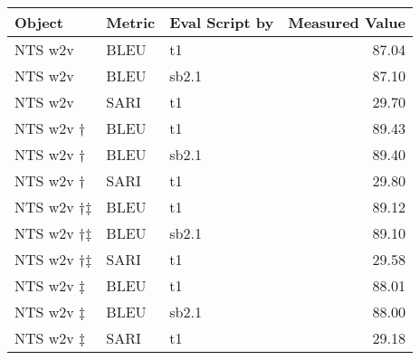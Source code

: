 \begin{tabular}{lllr}
\toprule
     Object & Metric & Eval Script by & Measured Value \\
\midrule
    NTS w2v &   BLEU &             t1 &          87.04 \\
    NTS w2v &   BLEU &          sb2.1 &          87.10 \\
    NTS w2v &   SARI &             t1 &          29.70 \\
  NTS w2v † &   BLEU &             t1 &          89.43 \\
  NTS w2v † &   BLEU &          sb2.1 &          89.40 \\
  NTS w2v † &   SARI &             t1 &          29.80 \\
 NTS w2v †‡ &   BLEU &             t1 &          89.12 \\
 NTS w2v †‡ &   BLEU &          sb2.1 &          89.10 \\
 NTS w2v †‡ &   SARI &             t1 &          29.58 \\
  NTS w2v ‡ &   BLEU &             t1 &          88.01 \\
  NTS w2v ‡ &   BLEU &          sb2.1 &          88.00 \\
  NTS w2v ‡ &   SARI &             t1 &          29.18 \\
\bottomrule
\end{tabular}
